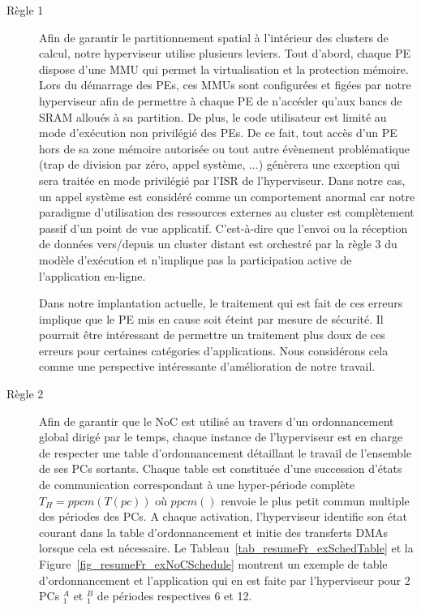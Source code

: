 \documentclass[main.tex]{subfiles}
\begin{document}
\begin{description}
    \item[Règle 1]
        Afin de garantir le partitionnement spatial à l'intérieur des clusters de calcul, notre hyperviseur utilise plusieurs leviers. Tout d'abord, chaque PE dispose d'une MMU qui permet la virtualisation et la protection mémoire. Lors du démarrage des PEs, ces MMUs sont configurées et figées par notre hyperviseur afin de permettre à chaque PE de n'accéder qu'aux bancs de SRAM alloués à sa partition. De plus, le code utilisateur est limité au mode d'exécution non privilégié des PEs. De ce fait, tout accès d'un PE hors de sa zone mémoire autorisée ou tout autre évènement problématique (trap de division par zéro, appel système, ...) génèrera une exception qui sera traitée en mode privilégié par l'ISR de l'hyperviseur. Dans notre cas, un appel système est considéré comme un comportement anormal car notre paradigme d'utilisation des ressources externes au cluster est complètement passif d'un point de vue applicatif. C'est-à-dire que l'envoi ou la réception de données vers/depuis un cluster distant est orchestré par la règle 3 du modèle d'exécution et n'implique pas la participation active de l'application en-ligne.
        
        Dans notre implantation actuelle, le traitement qui est fait de ces erreurs implique que le PE mis en cause soit éteint par mesure de sécurité. Il pourrait être intéressant de permettre un traitement plus doux de ces erreurs pour certaines catégories d'applications. Nous considérons cela comme une perspective intéressante d'amélioration de notre travail.
    \item[Règle 2]
        Afin de garantir que le NoC est utilisé au travers d'un ordonnancement global dirigé par le temps, chaque instance de l'hyperviseur est en charge de respecter une table d'ordonnancement détaillant le travail de l'ensemble de ses PCs sortants. Chaque table est constituée d'une succession d'états de communication correspondant à une hyper-période complète $T_H = ppcm(T(pc))$ où $ppcm()$ renvoie le plus petit commun multiple des périodes des PCs. A chaque activation, l'hyperviseur identifie son état courant dans la table d'ordonnancement et initie des transferts DMAs lorsque cela est nécessaire. Le Tableau~\ref{tab_resumeFr_exSchedTable} et la Figure~\ref{fig_resumeFr_exNoCSchedule} montrent un exemple de table d'ordonnancement et l'application qui en est faite par l'hyperviseur pour 2 PCs \PC$_1^A$ et \PC$_1^B$ de périodes respectives 6 et 12.


\end{description}
\end{document}
